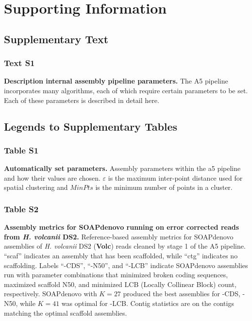 \documentclass[10pt]{article}
\begin{document}
\clearpage



\section*{Supporting Information}
\subsection*{Supplementary Text}
\subsubsection*{Text S1} 
\textbf{Description internal assembly pipeline parameters.}
The A5 pipeline incorporates many algorithms, each of which require certain parameters to be set. 
Each of these parameters is described in detail here.

\subsection*{Legends to Supplementary Tables}


\subsubsection*{Table S1}
\textbf{Automatically set parameters.} 
Assembly parameters within the a5 pipeline and how their values are chosen. $\varepsilon$ is the maximum inter-point distance 
used for spatial clustering and $MinPts$ is the minimum number of points in a cluster.

\subsubsection*{Table S2}
\textbf{Assembly metrics for SOAPdenovo running on error corrected reads from \textit{H. volcanii} DS2.}
Reference-based assembly metrics for SOAPdenovo assemblies of \textit{H. volcanii} DS2 
(\textbf{Volc}) reads cleaned by stage 1 of the A5 pipeline. ``scaf'' indicates an assembly that has been scaffolded, while ``ctg'' indicates no scaffolding. 
Labels ``-CDS'', ``-N50'', and ``-LCB'' indicate SOAPdenovo assemblies run with parameter combinations that minimized broken coding 
sequences, maximized scaffold N50, and minimized LCB (Locally Collinear Block) count, respectively.
SOAPdenovo with $K=27$ produced the best assemblies for -CDS, -N50, while $K=41$ was optimal for -LCB. Contig statistics are on the contigs matching the optimal scaffold assemblies.
\end{document}
